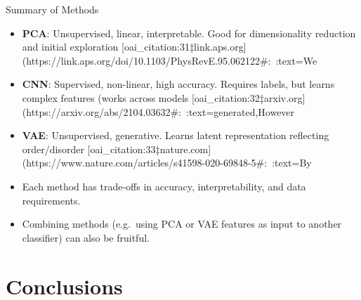 \documentclass{beamer}
\begin{document}
\begin{frame}{Summary of Methods}
 \begin{itemize}
   \item \textbf{PCA}: Unsupervised, linear, interpretable. Good for dimensionality reduction and initial exploration [oai_citation:31‡link.aps.org](https://link.aps.org/doi/10.1103/PhysRevE.95.062122#:~:text=We%
   \item \textbf{CNN}: Supervised, non-linear, high accuracy. Requires labels, but learns complex features (works across models [oai_citation:32‡arxiv.org](https://arxiv.org/abs/2104.03632#:~:text=generated,However%
   \item \textbf{VAE}: Unsupervised, generative. Learns latent representation reflecting order/disorder [oai_citation:33‡nature.com](https://www.nature.com/articles/s41598-020-69848-5#:~:text=By%
   \item Each method has trade-offs in accuracy, interpretability, and data requirements.
   \item Combining methods (e.g.\ using PCA or VAE features as input to another classifier) can also be fruitful.
 \end{itemize}
\end{frame}

\section{Conclusions}
\end{document}
